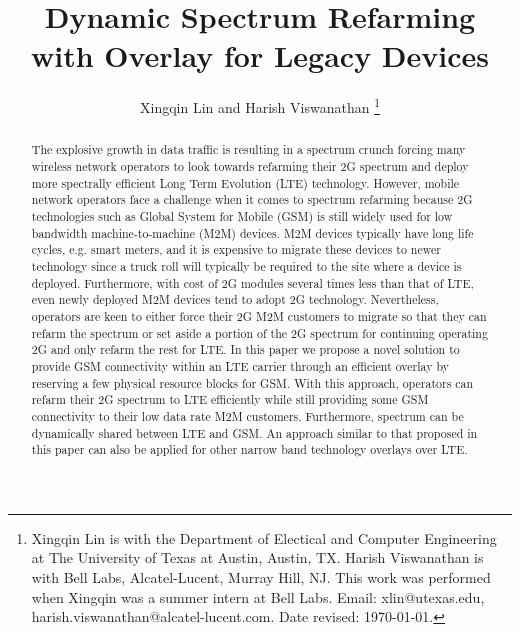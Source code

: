 \documentclass[10pt,journal]{IEEEtran}
\theoremstyle{slplain}
\begin{document}
\title{Dynamic Spectrum Refarming\\ with Overlay for Legacy Devices}



\author{
Xingqin Lin and Harish Viswanathan
\thanks{Xingqin Lin is with the Department of Electical and Computer Engineering at The University of Texas at Austin, Austin, TX. Harish Viswanathan is with Bell Labs, Alcatel-Lucent, Murray Hill, NJ. This work was performed when Xingqin was a summer intern at Bell Labs. Email: xlin@utexas.edu, harish.viswanathan@alcatel-lucent.com. Date revised: \today.}
}

\maketitle


\begin{abstract}
The explosive growth in data traffic is resulting in a spectrum crunch forcing many wireless network operators to look towards refarming their 2G spectrum and deploy more spectrally efficient Long Term Evolution (LTE) technology. However, mobile network operators face a challenge when it comes to spectrum refarming because 2G technologies such as Global System for Mobile (GSM) is still widely used for low bandwidth machine-to-machine (M2M) devices. M2M devices typically have long life cycles, e.g. smart meters, and  it is expensive to migrate these devices to newer technology since a truck roll will typically be required to the site where a device is deployed. Furthermore, with cost of 2G modules several times less than that of LTE, even newly deployed M2M devices tend to adopt 2G technology. Nevertheless, operators are keen to either force their 2G M2M customers to migrate so that they can refarm the spectrum or set aside a portion of the 2G spectrum for continuing operating 2G and only refarm the rest for LTE. In this paper we propose a novel solution to provide GSM connectivity within an LTE carrier through an efficient overlay by reserving a few physical resource blocks for GSM. With this approach, operators can refarm their 2G spectrum to LTE efficiently while still providing some GSM connectivity to their low data rate M2M customers. Furthermore, spectrum can be dynamically shared between LTE and GSM. An approach similar to that proposed in this paper can also be applied for other narrow band technology overlays over LTE.
\end{abstract}


\IEEEpeerreviewmaketitle
\end{document}
